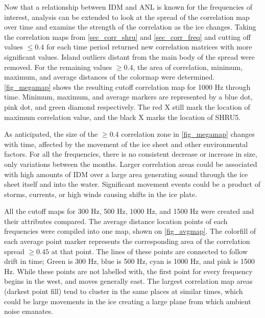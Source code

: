 Now that a relationship between IDM and ANL is known for the frequencies of interest, analysis can be extended to look at the spread of the correlation map over time and examine the strength of the correlation as the ice changes. Taking the correlation maps from \autoref{sec_corr_shru} and \autoref{sec_corr_freq} and cutting off values $\leq 0.4$ for each time period returned new correlation matrices with more significant values. Island outliers distant from the main body of the spread were removed. For the remaining values $\geq 0.4$, the area of correlation, minimum, maximum, and average distances of the colormap were determined. \autoref{fig_megamap} shows the resulting cutoff correlation map for 1000 Hz through time. Minimum, maximum, and average markers are represented by a blue dot, pink dot, and green diamond respectively. The red X still mark the location of maximum correlation value, and the black X marks the location of SHRU5.

As anticipated, the size of the $\geq 0.4$ correlation zone in \autoref{fig_megamap} changes with time, affected by the movement of the ice sheet and other environmental factors. For all the frequencies, there is no consistent decrease or increase in size, only variations between the months. Larger correlation areas could be associated with high amounts of IDM over a large area generating sound through the ice sheet itself and into the water. Significant movement events could be a product of storms, currents, or high winds causing shifts in the ice plate. %

All the cutoff maps for 300 Hz, 500 Hz, 1000 Hz, and 1500 Hz were created and their attributes compared. The average distance location points of each frequencies were compiled into one map, shown on \autoref{fig_avgmap}. The colorfill of each average point marker represents the corresponding area of the correlation spread $\geq 0.45$ at that point. The lines of these points are connected to follow drift in time; Green is 300 Hz, blue is 500 Hz, cyan is 1000 Hz, and pink is 1500 Hz. While these points are not labelled with, the first point for every frequency begins in the west, and moves generally east. The largest correlation map areas (darkest point fill) tend to cluster in the same places at similar times, which could be large movements in the ice creating a large plane from which ambient noise emanates.

